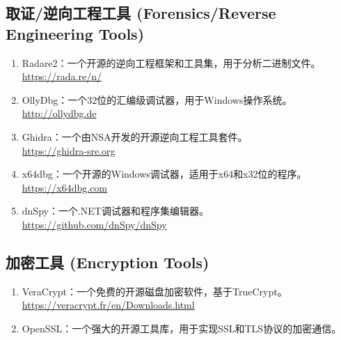 \documentclass[11pt]{article}
\begin{document}
\subsection{取证/逆向工程工具 (Forensics/Reverse Engineering Tools)}
\label{sec:org22964b8}
\begin{enumerate}
\item Radare2：一个开源的逆向工程框架和工具集，用于分析二进制文件。\\
\url{https://rada.re/n/}
\item OllyDbg：一个32位的汇编级调试器，用于Windows操作系统。\\
\url{http://ollydbg.de}
\item Ghidra：一个由NSA开发的开源逆向工程工具套件。\\
\url{https://ghidra-sre.org}
\item x64dbg：一个开源的Windows调试器，适用于x64和x32位的程序。 \\
\url{https://x64dbg.com}
\item dnSpy：一个.NET调试器和程序集编辑器。\\
\url{https://github.com/dnSpy/dnSpy}
\end{enumerate}

\subsection{加密工具 (Encryption Tools)}
\label{sec:orgee17fef}
\begin{enumerate}
\item VeraCrypt：一个免费的开源磁盘加密软件，基于TrueCrypt。
\url{https://veracrypt.fr/en/Downloads.html}
\item OpenSSL：一个强大的开源工具库，用于实现SSL和TLS协议的加密通信。
\end{enumerate}
\end{document}
